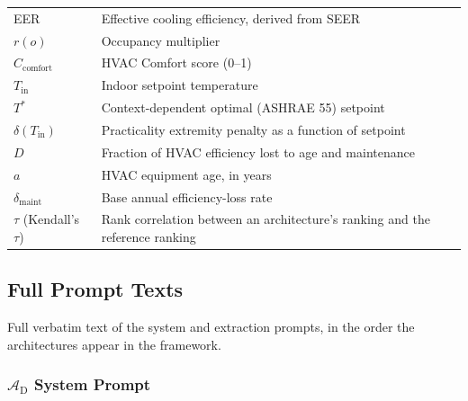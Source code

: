 \documentclass[11pt]{article}
\begin{document}
\begin{table}[htbp]
\begin{tabular}{@{}ll@{}}
EER & Effective cooling efficiency, derived from SEER \\
$r(o)$ & Occupancy multiplier \\
$C_{\mathrm{comfort}}$ & HVAC Comfort score (0--1) \\
$T_{\mathrm{in}}$ & Indoor setpoint temperature \\
$T^{*}$ & Context-dependent optimal (ASHRAE 55) setpoint \\
$\delta(T_{\mathrm{in}})$ & Practicality extremity penalty as a function of setpoint \\
$D$ & Fraction of HVAC efficiency lost to age and maintenance \\
$a$ & HVAC equipment age, in years \\
$\delta_{\mathrm{maint}}$ & Base annual efficiency-loss rate \\
$\tau$ (Kendall's $\tau$) & Rank correlation between an architecture's ranking and the reference ranking \\
\bottomrule
\end{tabular}
\end{table}

\subsection{Full Prompt Texts}
\label{app:prompts}

Full verbatim text of the system and extraction prompts, in the order the architectures appear in the framework.

\subsubsection{\texorpdfstring{$\mathcal{A}_{\text{D}}$}{A\_D} System Prompt}
\end{document}
